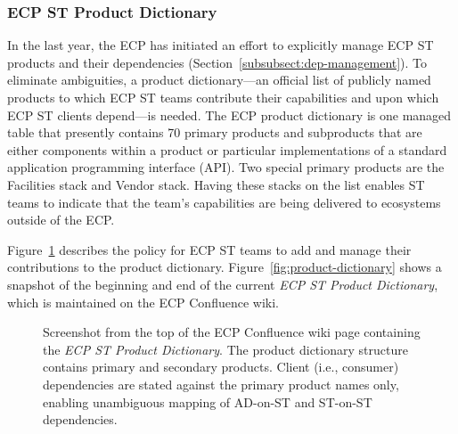 \subsubsection{ECP ST Product Dictionary}\label{subsubsect:dictionary}
In the last year, the ECP has initiated an effort to explicitly manage ECP ST products and their dependencies (Section~\ref{subsubsect:dep-management}).  To eliminate ambiguities, a product dictionary---an official list of publicly named products to which ECP ST teams contribute their capabilities and upon which ECP ST clients depend---is needed.  The ECP product dictionary is one managed table that presently contains 70 primary products and subproducts that are either components within a product or particular implementations of a standard application programming interface (API).  Two special primary products are the Facilities stack and Vendor stack.  Having these stacks on the list enables ST teams to indicate that the team's capabilities are being delivered to ecosystems outside of the ECP.

Figure~\ref{fig:product-dictionary-overview} describes the policy for ECP ST teams to add and manage their contributions to the product dictionary.  Figure~\ref{fig:product-dictionary} shows a snapshot of the beginning and end of the current \textit{ECP ST Product Dictionary}, which is maintained on the ECP Confluence wiki.

\begin{figure}
	\centering
	\caption{Screenshot from the top of the ECP Confluence wiki page containing the \textit{ECP ST Product Dictionary}.  The product dictionary structure contains primary and secondary products.  Client (i.e., consumer) dependencies are stated against the primary product names only, enabling unambiguous mapping of AD-on-ST and ST-on-ST dependencies.}
	\label{fig:product-dictionary-overview}
\end{figure}

